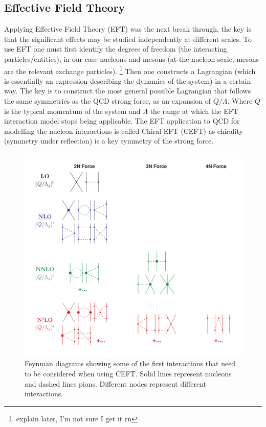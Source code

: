 \subsection{Effective Field Theory}
Applying Effective Field Theory (EFT) was the next break through, the key is that the significant effects may be studied independently at different scales.
To use EFT one must first identify the degrees of freedom (the interacting particles/entities), in our case nucleons and mesons (at the nucleon scale, mesons are the relevant exchange particles).
\footnote{explain later, I'm not sure I get it rn}
Then one constructs a Lagrangian (which is essentially an expression describing the dynamics of the system) in a certain way.
The key is to construct the most general possible Lagrangian that follows the same symmetries as the QCD strong force, as an expansion of $Q/\Lambda$.
Where $Q$ is the typical momentum of the system and $\Lambda$ the range at which the EFT interaction model stops being applicable.
The EFT application to QCD for modelling the nucleon interactions is called Chiral EFT (CEFT) as chirality (symmetry under reflection) is a key symmetry of the strong force.

\begin{figure}[H]
    \centering
    \includegraphics[width=.4\textwidth]{images/NFthe_diagram.png}
    \caption{Feynman diagrams showing some of the first interactions that need to be considered when using CEFT. Solid lines represent nucleons and dashed lines pions. Different nodes represent different interactions.}\label{fig:diagram1}
\end{figure}

